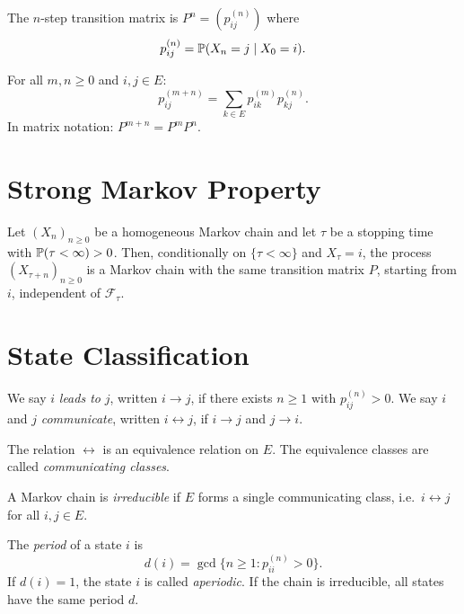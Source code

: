 \begin{definition}
The $n$-step transition matrix is $P^n = (p_{ij}^{(n)})$ where
\[
  p_{ij}^{(n)} = \mathbb{P}(X_n = j \mid X_0 = i).
\]
\end{definition}

\begin{theorem}
For all $m, n \geq 0$ and $i, j \in E$:
\[
  p_{ij}^{(m+n)} = \sum_{k \in E} p_{ik}^{(m)} p_{kj}^{(n)}.
\]
In matrix notation: $P^{m+n} = P^m P^n$.
\end{theorem}

\section{Strong Markov Property}

\begin{theorem}
\label{thm:strong_markov}
Let $(X_n)_{n \geq 0}$ be a homogeneous Markov chain and let $\tau$ be a stopping
time with $\mathbb{P}(\tau < \infty) > 0$. Then, conditionally on $\{\tau < \infty\}$
and $X_{\tau} = i$, the process $(X_{\tau + n})_{n \geq 0}$ is a Markov chain
with the same transition matrix $P$, starting from $i$, independent of
$\mathcal{F}_{\tau}$.
\end{theorem}

\section{State Classification}

\begin{definition}[Communication]
We say $i$ \emph{leads to} $j$, written $i \to j$, if there exists $n \geq 1$
with $p_{ij}^{(n)} > 0$. We say $i$ and $j$ \emph{communicate}, written
$i \leftrightarrow j$, if $i \to j$ and $j \to i$.
\end{definition}

\begin{proposition}
The relation $\leftrightarrow$ is an equivalence relation on $E$. The equivalence
classes are called \emph{communicating classes}.
\end{proposition}

\begin{definition}
A Markov chain is \emph{irreducible} if $E$ forms a single communicating class,
i.e.\ $i \leftrightarrow j$ for all $i, j \in E$.
\end{definition}

\begin{definition}[Period]
The \emph{period} of a state $i$ is
\[
  d(i) = \gcd\{n \geq 1 : p_{ii}^{(n)} > 0\}.
\]
If $d(i) = 1$, the state $i$ is called \emph{aperiodic}. If the chain is
irreducible, all states have the same period $d$.
\end{definition}


